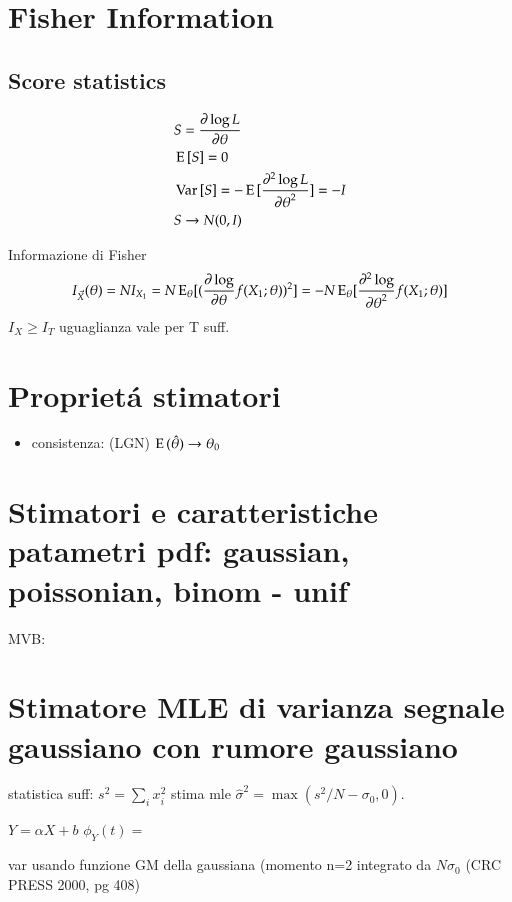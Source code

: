 \section{Fisher Information}

\subsection{Score statistics}

\begin{align*}
&S=\frac{\partial \log{L}}{\partial \theta}\\
&\operatorname{E}{[S]}=0\\
&\operatorname{Var}{[S]}=-\operatorname{E}{[\frac{\partial^2 \log{L}}{{\partial \theta}^2}]}=-I\\
&S\to N(0,I)
\end{align*}

Informazione di Fisher
\[I_{\Vec{X}}(\theta)=NI_{X_1}=N\operatorname{E}_{\theta}[(\frac{\partial \log}{\partial \theta}{f(X_1;\theta)})^2]=-N\operatorname{E}_{\theta}[\frac{\partial^2 \log}{{\partial \theta}^2}{f(X_1;\theta)}]\]
$I_{X}\geq I_T$ uguaglianza vale per T suff.

\section{Propriet\'a stimatori}

\begin{itemize}
\item consistenza: (LGN) $\operatorname{E}{(\hat{\theta})}\to\theta_0$
\end{itemize}

\section{Stimatori e caratteristiche patametri pdf: gaussian, poissonian, binom - unif}

MVB:

\section{Stimatore MLE di varianza segnale gaussiano con rumore gaussiano}

statistica suff: $s^2=\sum_ix_i^2$
stima mle $\hat{\sigma}^2=\max{(s^2/N-\sigma_0,0)}$.

$Y=\alpha X+b$ $\phi_Y(t)=$

var usando funzione GM della gaussiana
(momento n=2 integrato da $N\sigma_0$
(CRC PRESS 2000, pg 408)